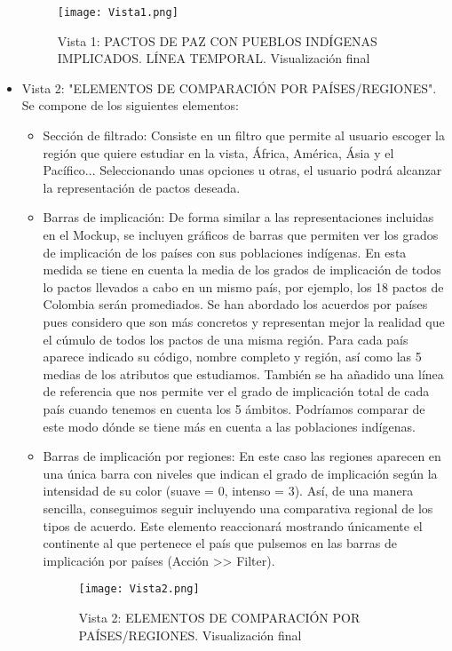 \documentclass[11pt]{article}
\begin{document}
\begin{itemize}
\begin{figure}[h!]
    \caption{Vista 1: PACTOS DE PAZ CON PUEBLOS INDÍGENAS IMPLICADOS. LÍNEA TEMPORAL. Visualización final}
\texttt{[image: Vista1.png]}
\end{figure}

    \item Vista 2: "ELEMENTOS DE COMPARACIÓN POR PAÍSES/REGIONES". Se compone de los siguientes elementos:
    \begin{itemize}
        \item Sección de filtrado: Consiste en un filtro que permite al usuario escoger la región que quiere estudiar en la vista, África, América, Ásia y el Pacífico... Seleccionando unas opciones u otras, el usuario podrá alcanzar la representación de pactos deseada.
        
        \item Barras de implicación: De forma similar a las representaciones incluidas en el Mockup, se incluyen gráficos de barras que permiten ver los grados de implicación de los países con sus poblaciones indígenas. En esta medida se tiene en cuenta la media de los grados de implicación de todos lo pactos llevados a cabo en un mismo país, por ejemplo, los 18 pactos de Colombia serán promediados. Se han abordado los acuerdos por países pues considero que son más concretos y representan mejor la realidad que el cúmulo de todos los pactos de una misma región. Para cada país aparece indicado su código, nombre completo y región, así como las 5 medias de los atributos que estudiamos. También se ha añadido una línea de referencia que nos permite ver el grado de implicación total de cada país cuando tenemos en cuenta los 5 ámbitos. Podríamos comparar de este modo dónde se tiene más en cuenta a las poblaciones indígenas.
        
        \item Barras de implicación por regiones: En este caso las regiones aparecen en una única barra con niveles que indican el grado de implicación según la intensidad de su color (suave = 0, intenso = 3). Así, de una manera sencilla, conseguimos seguir incluyendo una comparativa regional de los tipos de acuerdo. Este elemento reaccionará mostrando únicamente el continente al que pertenece el país que pulsemos en las barras de implicación por países (Acción >> Filter).
        
        \begin{figure}[h]
\texttt{[image: Vista2.png]}
\caption{Vista 2: ELEMENTOS DE COMPARACIÓN POR PAÍSES/REGIONES. Visualización final}
\end{figure}
        
    \end{itemize}
\end{itemize}
\end{document}
